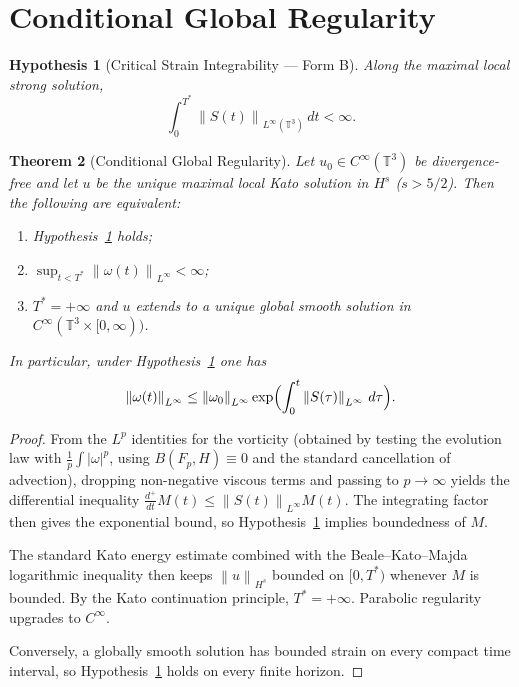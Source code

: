 \documentclass[11pt,reqno]{amsart}
\newtheorem{theorem}{Theorem}[section]
\newtheorem{hypothesis}[theorem]{Hypothesis}
\theoremstyle{definition}
\newcommand{\T}{\mathbb{T}^3}
\newcommand{\norm}[1]{\left\| #1 \right\|}
\begin{document}
\section{Conditional Global Regularity}

\begin{hypothesis}[Critical Strain Integrability --- Form B]\label{hyp:B}
Along the maximal local strong solution,
\begin{equation}\label{eq:hyp_B}
\int_0^{T^*} \norm{S(t)}_{L^\infty(\T)}\, dt < \infty.
\end{equation}
\end{hypothesis}

\begin{theorem}[Conditional Global Regularity]\label{thm:main}
Let $u_0 \in C^\infty(\T)$ be divergence-free and let $u$ be the unique maximal local Kato solution in $H^s$ ($s > 5/2$). Then the following are equivalent:
\begin{enumerate}
\item Hypothesis~\ref{hyp:B} holds;
\item $\sup_{t < T^*} \norm{\omega(t)}_{L^\infty} < \infty$;
\item $T^* = +\infty$ and $u$ extends to a unique global smooth solution in $C^\infty(\T \times [0,\infty))$.
\end{enumerate}
In particular, under Hypothesis~\ref{hyp:B} one has
\[
\norm{\omega(t)}_{L^\infty} \le \norm{\omega_0}_{L^\infty} \exp\Bigl( \int_0^t \norm{S(\tau)}_{L^\infty}\, d\tau \Bigr).
\]
\end{theorem}

\begin{proof}
From the $L^p$ identities for the vorticity (obtained by testing the evolution law with $\frac1p\int|\omega|^p$, using $B(F_p,H)\equiv 0$ and the standard cancellation of advection), dropping non-negative viscous terms and passing to $p\to\infty$ yields the differential inequality $\frac{d^+}{dt}M(t) \le \norm{S(t)}_{L^\infty} M(t)$. The integrating factor then gives the exponential bound, so Hypothesis~\ref{hyp:B} implies boundedness of $M$.

The standard Kato energy estimate combined with the Beale--Kato--Majda logarithmic inequality then keeps $\norm{u}_{H^s}$ bounded on $[0,T^*)$ whenever $M$ is bounded. By the Kato continuation principle, $T^*=+\infty$. Parabolic regularity upgrades to $C^\infty$.

Conversely, a globally smooth solution has bounded strain on every compact time interval, so Hypothesis~\ref{hyp:B} holds on every finite horizon.
\end{proof}
\end{document}
